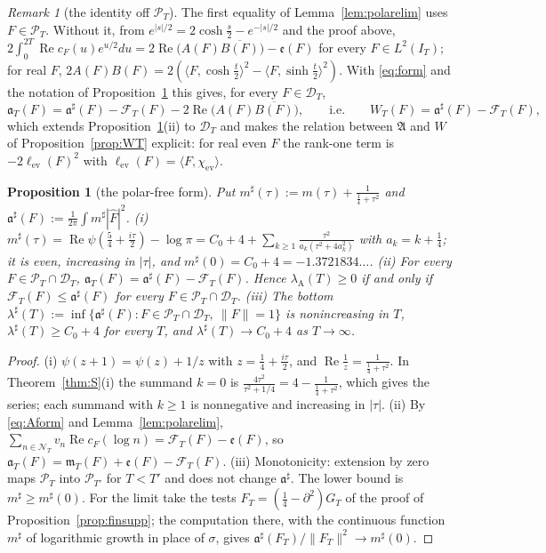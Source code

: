 \documentclass[11pt]{amsart}
\newtheorem{proposition}[theorem]{Proposition}
\theoremstyle{definition}
\theoremstyle{remark}
\newtheorem{remark}[theorem]{Remark}
\newcommand{\Rel}{\operatorname{Re}}
\newcommand{\PT}{\mathcal P_T}
\newcommand{\IT}{I_T}
\newcommand{\lamA}{\lambda_{\mathrm A}(T)}
\newcommand{\Fh}{\widehat F}
\newcommand{\cF}{c_F}
\newcommand{\NT}{\mathcal N_T}
\newcommand{\mT}{\mathfrak m_T}
\begin{document}
\begin{remark}[the identity off $\PT$]\label{rem:polarelim-full}
The first equality of Lemma~\ref{lem:polarelim} uses $F\in\PT$. Without it, from $e^{|s|/2}=2\cosh\frac s2-e^{-|s|/2}$ and the
proof above, $2\int_0^{2T}\Rel\cF(u)e^{u/2}du=2\Rel\big(A(F)\overline{B(F)}\big)-\mathfrak e(F)$ for every $F\in L^2(\IT)$; for real
$F$, $2A(F)B(F)=2(\langle F,\cosh\frac t2\rangle^2-\langle F,\sinh\frac t2\rangle^2)$. With \eqref{eq:form} and the notation of
Proposition~\ref{prop:sharp} this gives, for every $F\in\mathcal D_T$,
\[
\mathfrak a_T(F)=\mathfrak a^\sharp(F)-\mathcal F_T(F)-2\Rel\big(A(F)\overline{B(F)}\big),\qquad\text{i.e.}\qquad W_T(F)=\mathfrak a^\sharp(F)-\mathcal F_T(F),
\]
which extends Proposition~\ref{prop:sharp}(ii) to $\mathcal D_T$ and makes the relation between $\mathfrak A$ and $W$ of
Proposition~\ref{prop:WT} explicit: for real even $F$ the rank-one term is $-2\ell_{\mathrm{ev}}(F)^2$ with
$\ell_{\mathrm{ev}}(F)=\langle F,\chi_{\mathrm{ev}}\rangle$.
\end{remark}

\begin{proposition}[the polar-free form]\label{prop:sharp}
Put $m^\sharp(\tau):=m(\tau)+\frac1{\frac14+\tau^2}$ and $\mathfrak a^\sharp(F):=\frac1{2\pi}\int m^\sharp|\Fh|^2$.
\emph{(i)} $m^\sharp(\tau)=\Rel\psi(\frac54+\frac{i\tau}2)-\log\pi=C_0+4+\sum_{k\ge1}\frac{\tau^2}{a_k(\tau^2+4a_k^2)}$ with
$a_k=k+\frac14$; it is even, increasing in $|\tau|$, and $m^\sharp(0)=C_0+4=-1.3721834\ldots$.
\emph{(ii)} For every $F\in\PT\cap\mathcal D_T$, $\mathfrak a_T(F)=\mathfrak a^\sharp(F)-\mathcal F_T(F)$. Hence $\lamA\ge0$
if and only if $\mathcal F_T(F)\le\mathfrak a^\sharp(F)$ for every $F\in\PT\cap\mathcal D_T$.
\emph{(iii)} The bottom $\lambda^\sharp(T):=\inf\{\mathfrak a^\sharp(F):F\in\PT\cap\mathcal D_T,\ \|F\|=1\}$ is nonincreasing in $T$,
$\lambda^\sharp(T)\ge C_0+4$ for every $T$, and $\lambda^\sharp(T)\to C_0+4$ as $T\to\infty$.
\end{proposition}

\begin{proof}
(i) $\psi(z+1)=\psi(z)+1/z$ with $z=\frac14+\frac{i\tau}2$, and $\Rel\frac1z=\frac1{\frac14+\tau^2}$. In Theorem~\ref{thm:S}(i) the
summand $k=0$ is $\frac{4\tau^2}{\tau^2+1/4}=4-\frac1{\frac14+\tau^2}$, which gives the series; each summand with $k\ge1$ is
nonnegative and increasing in $|\tau|$. (ii) By \eqref{eq:Aform} and Lemma~\ref{lem:polarelim},
$\sum_{n\in\NT}v_n\Rel\cF(\log n)=\mathcal F_T(F)-\mathfrak e(F)$, so
$\mathfrak a_T(F)=\mT(F)+\mathfrak e(F)-\mathcal F_T(F)$. (iii) Monotonicity: extension by zero maps $\PT$ into
$\mathcal P_{T'}$ for $T<T'$ and does not change $\mathfrak a^\sharp$. The lower bound is $m^\sharp\ge m^\sharp(0)$. For the
limit take the tests $F_T=(\frac14-\partial^2)G_T$ of the proof of Proposition~\ref{prop:finsupp}; the computation there,
with the continuous function $m^\sharp$ of logarithmic growth in place of $\sigma$, gives
$\mathfrak a^\sharp(F_T)/\|F_T\|^2\to m^\sharp(0)$.
\end{proof}
\end{document}
